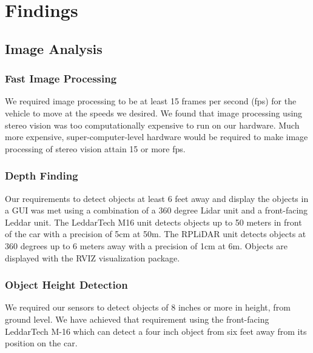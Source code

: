 \documentclass[compsoc,draftclsnofoot,onecolumn,10pt]{IEEEtran}
\begin{document}
\section{Findings}
\subsection{Image Analysis}
\subsubsection{Fast Image Processing}
We required image processing to be at least 15 frames per second (fps) for the vehicle to move at the speeds we desired. We found that image processing using stereo vision was too computationally expensive to run on our hardware. Much more expensive, super-computer-level hardware would be required to make image processing of stereo vision attain 15 or more fps.

\subsubsection{Depth Finding}
Our requirements to detect objects at least 6 feet away and display the objects in a GUI was met using a combination of a 360 degree Lidar unit and a front-facing Leddar unit. The LeddarTech M16 unit detects objects up to 50 meters in front of the car with a precision of 5cm at 50m. The RPLiDAR unit detects objects at 360 degrees up to 6 meters away with a precision of 1cm at 6m. Objects are displayed with the RVIZ visualization package.

\subsubsection{Object Height Detection}
We required our sensors to detect objects of 8 inches or more in height, from
ground level. We have achieved that requirement using the front-facing
LeddarTech M-16 which can detect a four inch object from six feet away from its
position on the car.
\end{document}

